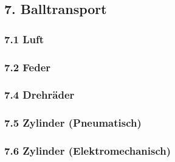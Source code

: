 \subsection{7. Balltransport}

\subsubsection{7.1 Luft}

\subsubsection{7.2 Feder}

\subsubsection{7.4 Drehräder}

\subsubsection{7.5 Zylinder (Pneumatisch)}

\subsubsection{7.6 Zylinder (Elektromechanisch)}
